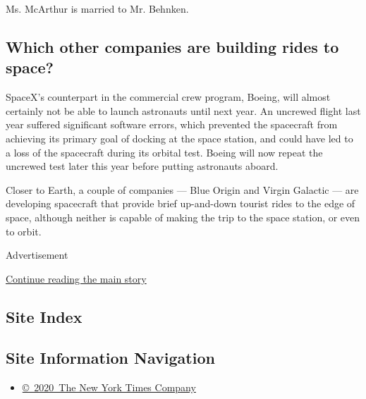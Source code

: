 Ms. McArthur is married to Mr. Behnken.

\hypertarget{which-other-companies-are-building-rides-to-space}{%
\subsection{Which other companies are building rides to
space?}\label{which-other-companies-are-building-rides-to-space}}

SpaceX's counterpart in the commercial crew program, Boeing, will almost
certainly not be able to launch astronauts until next year. An uncrewed
flight last year suffered significant software errors, which prevented
the spacecraft from achieving its primary goal of docking at the space
station, and could have led to a loss of the spacecraft during its
orbital test. Boeing will now repeat the uncrewed test later this year
before putting astronauts aboard.

Closer to Earth, a couple of companies --- Blue Origin and Virgin
Galactic --- are developing spacecraft that provide brief up-and-down
tourist rides to the edge of space, although neither is capable of
making the trip to the space station, or even to orbit.

Advertisement

\protect\hyperlink{after-bottom}{Continue reading the main story}

\hypertarget{site-index}{%
\subsection{Site Index}\label{site-index}}

\hypertarget{site-information-navigation}{%
\subsection{Site Information
Navigation}\label{site-information-navigation}}

\begin{itemize}
\tightlist
\item
  \href{https://help.nytimes3xbfgragh.onion/hc/en-us/articles/115014792127-Copyright-notice}{©~2020~The
  New York Times Company}
\end{itemize}

